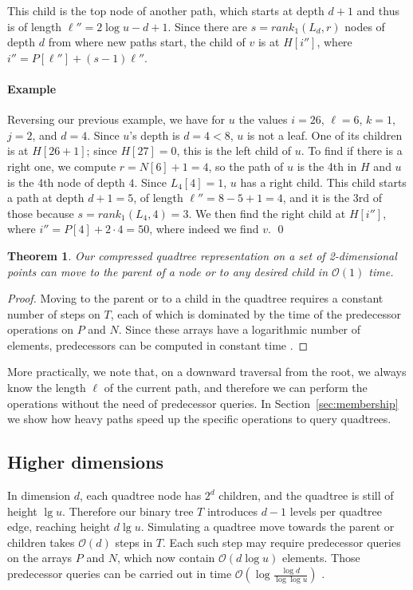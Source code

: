 \documentclass{elsarticle}
\newtheorem{theorem}{Theorem}
\newcommand{\Oh}[1]
  {\ensuremath{\mathcal{O}\!\left( {#1} \right)}}
\newenvironment{example}{\paragraph{Example}}{\qed \medskip }
\begin{document}
This child is the top node of another path, which starts at depth $d+1$ and thus is of length $\ell''=2\log u - d + 1$. Since there are $s = rank_1(L_d,r)$ nodes of depth $d$ from where new paths start, the child of $v$ is at $H[i'']$, where
$i''=P[\ell'']+(s-1)\ell''$.



\begin{example}
Reversing our previous example, we have for $u$ the values $i=26$, $\ell=6$, $k=1$, $j=2$, and $d=4$.  Since $u$'s depth is $d=4 < 8$, $u$ is not a leaf. One of its children is at $H[26+1]$; since $H[27]=0$, this is the left child of $u$. To find if there is a right one, we compute $r=N[6]+1=4$, so the path of $u$ is the 4th in $H$ and $u$ is the 4th node of depth $4$. Since $L_4[4]=1$, $u$ has a right child. This child starts a path at depth $d+1=5$, of length $\ell''=8-5+1=4$, and it is the 3rd of those because $s=rank_1(L_4,4)=3$. We then find the right child at $H[i'']$, where $i'' = P[4]+2\cdot 4 = 50$, where indeed we find $v$.
\end{example}



\begin{theorem}
Our compressed quadtree representation on a set of 2-dimensional points can move to the parent of a node or to any desired child in $\Oh{1}$ time.
\end{theorem}
\begin{proof}
Moving to the parent or to a child in the quadtree requires a constant number of steps on $T$, each of which is dominated by the time of the predecessor operations on $P$ and $N$. Since these arrays have a logarithmic number of elements, predecessors can be computed in constant time \cite{FW94}. 
\end{proof}

More practically, we note that, on a downward traversal from the root, we always know the length $\ell$ of the current path, and therefore we can perform the operations without the need of predecessor queries. In Section~\ref{sec:membership} we show how heavy paths speed up the specific operations to query quadtrees.

\subsection{Higher dimensions}

In dimension $d$, each quadtree node has $2^d$ children, and the quadtree is still of height $\lg u$. Therefore our binary tree $T$ introduces $d-1$ levels per quadtree edge, reaching height $d\lg u$. Simulating a quadtree move towards the parent or children takes $\Oh{d}$ steps in $T$. Each such step may require predecessor queries on the arrays $P$ and $N$, which now contain $\Oh{d\log u}$ elements. Those predecessor queries can be carried out in time $\Oh{\log\frac{\log d}{\log\log u}}$ \cite{PT06}.
\end{document}
